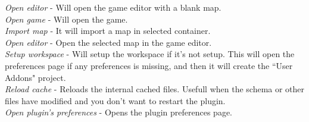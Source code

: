 \documentclass[10pt]{article}
\begin{document}
\begin{description}
   \textit{Open editor} - Will open the game editor with a blank map.\\
   \textit{Open game} - Will open the game.\\
   \textit{Import map} - It will import a map in selected container.\\
   \textit{Open editor} - Open the selected map in the game editor.\\
   \textit{Setup workspace} - Will setup the workspace if it's not setup. This will open the preferences page if any preferences is missing, and then it will create the ``User Addons" project.\\
   \textit{Reload cache} - Reloads the internal cached files. Usefull when the schema or other files have modified and you don't want to restart the plugin.\\
   \textit{Open plugin's preferences} - Opens the plugin preferences page.\\
\end{description}
\end{document}
